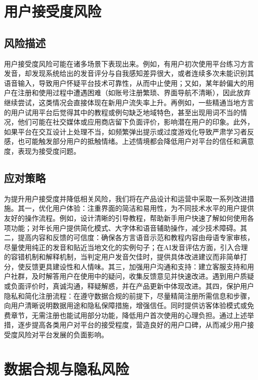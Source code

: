 \section{用户接受度风险}
\subsection{风险描述}
用户接受度风险可能在诸多场景下表现出来。例如，有用户初次使用平台练习方言发音，却发现系统给出的发音评分与自我感知差异很大，或者连续多次未能识别其语音输入，导致用户怀疑平台技术可靠性，从而中止使用；又如，某年龄偏大的用户在注册和使用过程中遭遇困难（如账号注册繁琐、界面导航不清晰），因此放弃继续尝试，这类情况会直接体现在新用户流失率上升。再例如，一些精通当地方言的用户试用平台后觉得其中的教程或例句缺乏地域特色，甚至出现用词不当的情况，他们可能在社交媒体或应用商店留下负面评价，影响潜在用户的印象。此外，如果平台在交互设计上处理不当，如频繁弹出提示或过度游戏化导致严肃学习者反感，也可能触发部分用户的抵触情绪。上述情境都会降低用户对平台的信任和满意度，表现为接受度问题。
\subsection{应对策略}
为提升用户接受度并降低相关风险，我们将在产品设计和运营中采取一系列改进措施。其一，优化用户体验：注重界面的简洁和易用性，为不同技术水平的用户提供友好的操作流程。例如，设计清晰的引导教程，帮助新手用户快速了解如何使用各项功能；对年长用户提供简化模式、大字体和语音辅助操作，减少技术障碍。其二，提高内容和反馈的可信度：确保各方言语音示范和教程内容由母语专家审核，尽量使用纯正的发音和贴近当地文化的实例句子；在AI发音评估方面，引入合理的容错机制和解释机制，当判定用户发音欠佳时，提供具体改进建议而非简单打分，使反馈更具建设性和人情味。其三，加强用户沟通和支持：建立客服支持和用户社群，及时解答用户在使用中的疑问，收集反馈意见并快速改进。遇到用户质疑或负面评价时，真诚沟通，释疑解惑，并在产品更新中体现改进。其四，保护用户隐私和简化注册流程：在遵守数据合规的前提下，尽量精简注册所需信息和步骤，向用户清晰说明数据用途和隐私保障措施，增强信任。同时提供访客体验模式或免费章节，无需注册也能试用部分功能，降低用户首次使用的心理负担。通过上述举措，逐步提高各类用户对平台的接受程度，营造良好的用户口碑，从而减少用户接受度风险对平台发展的负面影响。
\section{数据合规与隐私风险}
